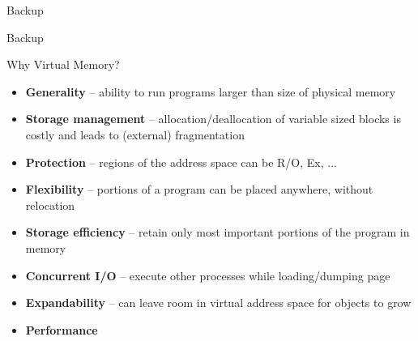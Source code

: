 \documentclass[aspectratio=169,12pt]{beamer}
\begin{document}
\begin{frame}{Backup}
\begin{center}
\Huge Backup
\end{center}
\end{frame}

\begin{frame}{Why Virtual Memory?}
\begin{itemize}
\item \textbf{Generality} – ability to run programs larger than size of physical memory
\item \textbf{Storage management} – allocation/deallocation of variable sized blocks is costly and leads to (external) fragmentation
\item \textbf{Protection} – regions of the address space can be R/O, Ex, ...
\item \textbf{Flexibility} – portions of a program can be placed anywhere, without relocation
\item \textbf{Storage efficiency} – retain only most important portions of the program in memory
\item \textbf{Concurrent I/O} – execute other processes while loading/dumping page
\item \textbf{Expandability} – can leave room in virtual address space for objects to grow
\item \textbf{Performance}
\end{itemize}
\end{frame}
\end{document}
